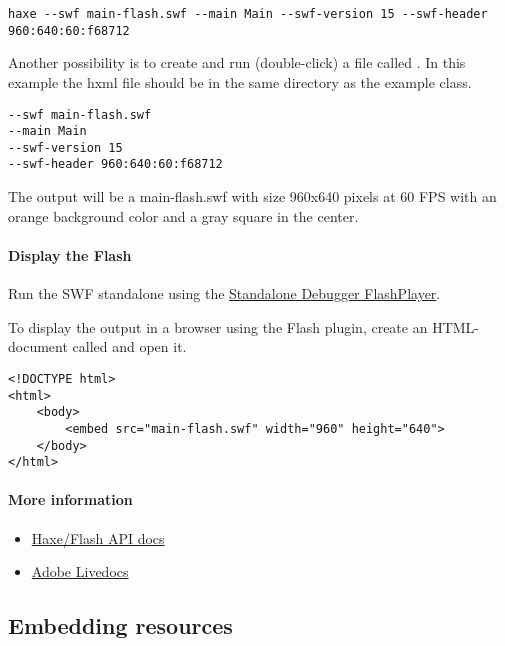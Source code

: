 \begin{lstlisting}
haxe --swf main-flash.swf --main Main --swf-version 15 --swf-header 960:640:60:f68712
\end{lstlisting}

Another possibility is to create and run (double-click) a file called . In this example the hxml file should be in the same directory as the example class.

\begin{lstlisting}
--swf main-flash.swf
--main Main
--swf-version 15
--swf-header 960:640:60:f68712
\end{lstlisting}

The output will be a main-flash.swf with size 960x640 pixels at 60 FPS with an orange background color and a gray square in the center.

\paragraph{Display the Flash}

Run the SWF standalone using the \href{https://www.adobe.com/support/flashplayer/downloads.html}{Standalone Debugger FlashPlayer}. 

To display the output in a browser using the Flash plugin, create an HTML-document called  and open it.

\begin{lstlisting}
<!DOCTYPE html>
<html>
	<body>
		<embed src="main-flash.swf" width="960" height="640">
	</body>
</html>
\end{lstlisting}

\paragraph{More information}

\begin{itemize}
	\item \href{https://api.haxe.org/flash/}{Haxe/Flash API docs}
	\item \href{http://help.adobe.com/en_US/FlashPlatform/reference/actionscript/3/}{Adobe Livedocs}
\end{itemize}

\subsection{Embedding resources}
\label{target-flash-resources}

